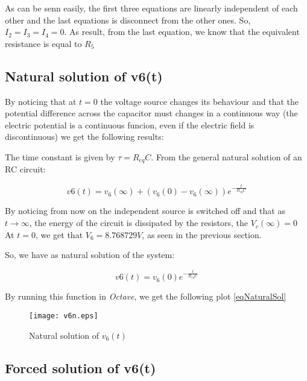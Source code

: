 \hfill


As can be senn easily, the first three equations are linearly independent of each other and the last equations is disconnect from the other ones. So, $I_2 = I_3 = I_4 = 0$. As result, from the last equation, we know that
the equivalent resistance is equal to $R_5$




\subsection{Natural solution of v6(t)}

By noticing that at $t = 0$ the voltage source changes its behaviour and that the potential difference across the capacitor must changes in a continuous way (the electric potential is a continuous funcion, even  if the electric field is discontinuous)
we get the following results:

The time constant is given by $\tau = R_{eq}C$.
From the general natural solution of an RC circuit:

\begin{equation}
  v6 (t) = v_6(\infty) + (v_6(0) - v_6(\infty)) e^{-\frac{t}{R_{eq}C}}
\end{equation}


By noticing from now on the independent source is switched off and that as $t \rightarrow \infty$, the energy of the circuit is dissipated by the resistors, the $V_c(\infty) = 0$
At $t = 0$, we get that $V_6 = 8.768729V$, as seen in the previous section.

So, we have as natural solution of the system:

\begin{equation}
  v6 (t) = v_6(0)e^{-\frac{t}{R_{eq}C}}
  \label{eqNaturalSol}
\end{equation}

By running this function in \textit{Octave}, we get the following plot \ref{eqNaturalSol}

\begin{figure}[h] \centering
  \texttt{[image: v6n.eps]}
  \caption{Natural solution of $v_6(t)$ }
  \label{fig:naturalSolution}
\end{figure}


\subsection{Forced solution of v6(t)}

